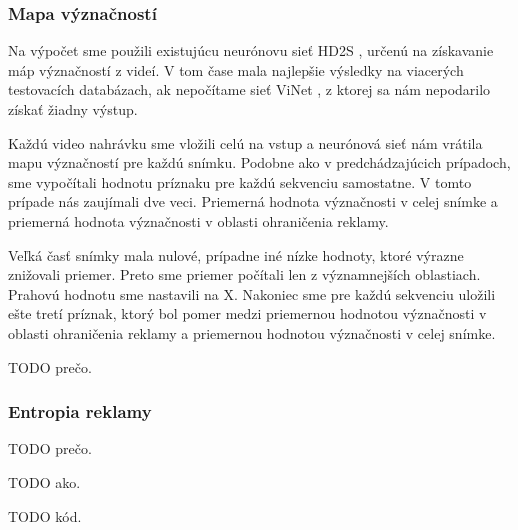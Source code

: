 \subsubsection{Mapa význačností}

Na výpočet sme použili existujúcu neurónovu sieť HD2S \cite{hd2s}, určenú na získavanie máp význačností z videí. V tom čase mala najlepšie výsledky na viacerých testovacích databázach, ak nepočítame sieť ViNet \cite{jain2021vinet}, z ktorej sa nám nepodarilo získať žiadny výstup.

Každú video nahrávku sme vložili celú na vstup a neurónová sieť nám vrátila mapu význačností pre každú snímku. Podobne ako v predchádzajúcich prípadoch, sme vypočítali hodnotu príznaku pre každú sekvenciu samostatne. V tomto prípade nás zaujímali dve veci. Priemerná hodnota význačnosti v celej snímke a priemerná hodnota význačnosti v oblasti ohraničenia reklamy.

Veľká časť snímky mala nulové, prípadne iné nízke hodnoty, ktoré výrazne znižovali priemer. Preto sme priemer počítali len z významnejších oblastiach. Prahovú hodnotu sme nastavili na X. Nakoniec sme pre každú sekvenciu uložili ešte tretí príznak, ktorý bol pomer medzi priemernou hodnotou význačnosti v oblasti ohraničenia reklamy a priemernou hodnotou význačnosti v celej snímke.

TODO prečo.

\subsubsection{Entropia reklamy}

TODO prečo.

TODO ako.

TODO kód.